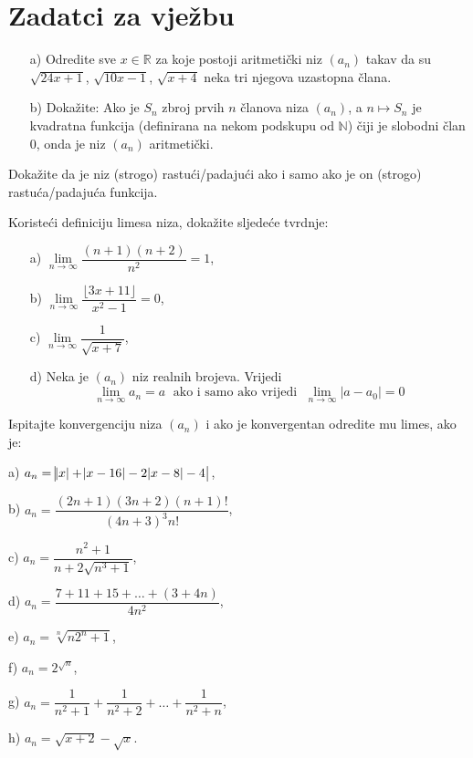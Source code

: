 \section*{Zadatci za vježbu}
\begin{exercise}\textbf{}
\begin{itemize}
\item[a)] Odredite sve $x\in \mathbb{R}$ za koje postoji aritmetički niz $(a_n)$ takav da su $\sqrt{24x+1}$, $\sqrt{10x-1}$, $\sqrt{x+4}$ neka tri njegova uzastopna člana.
\item[b)] Dokažite: Ako je $S_n$ zbroj prvih $n$ članova niza $(a_n)$, a $n\mapsto S_n$ je kvadratna funkcija (definirana na nekom podskupu od $\mathbb{N}$) čiji je slobodni član $0$, onda je niz $(a_n)$ aritmetički.
\end{itemize}
\end{exercise}
\begin{exercise}
Dokažite da je niz (strogo) rastući/padajući ako i samo ako je on (strogo) rastuća/padajuća funkcija.
\end{exercise}
\begin{exercise}
Koristeći definiciju limesa niza, dokažite sljedeće tvrdnje:
\begin{itemize}
\item[a)] $\lim\limits_{n\to \infty}{\dfrac{(n+1)(n+2)}{n^2}}=1$,
\item[b)] $\lim\limits_{n\to \infty}{\dfrac{\lfloor 3x+11\rfloor}{x^2-1}}=0$,
\item[c)] $\lim\limits_{n\to \infty}{\dfrac{1}{\sqrt{x+7}}}$,
\item[d)] Neka je $(a_n)$ niz realnih brojeva. Vrijedi $$\lim\limits_{n\to \infty}{a_n}=a\;\text{ ako i samo ako vrijedi }\;\lim\limits_{n\to \infty}{|a-a_0|}=0$$
\end{itemize}
\end{exercise}
\begin{exercise}
Ispitajte konvergenciju niza $(a_n)$ i ako je konvergentan odredite mu limes, ako je: 
\begin{AutoMultiColItemize}
\item[a)] $a_n=\abs{\abs{x}+\abs{x-16}-2\abs{x-8}-4}$,
\item[b)] $a_n=\dfrac{(2n+1)(3n+2)(n+1)!}{(4n+3)^3n!}$,
\item[c)] $a_n=\dfrac{n^2+1}{n+2\sqrt{n^3+1}}$,
\item[d)] $a_n=\dfrac{7+11+15+\dots+(3+4n)}{4n^2}$,
\item[e)] $a_n=\sqrt[n]{n2^n+1}$,
\item[f)] $a_n=2^{\sqrt{n}}$,
\item[g)] $a_n=\dfrac{1}{n^2+1}+\dfrac{1}{n^2+2}+\dots+\dfrac{1}{n^2+n}$,
\item[h)] $a_n=\sqrt{x+2}-\sqrt{x}$.
\end{AutoMultiColItemize}
\end{exercise}
